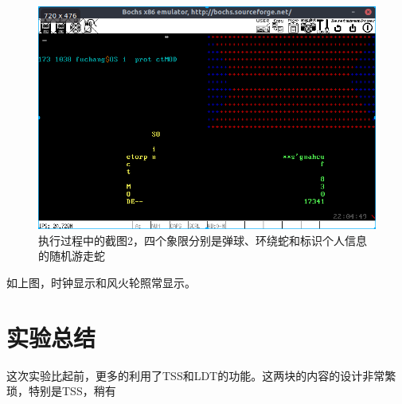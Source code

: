 \documentclass[a4paper,11pt,UTF8]{ctexart}
\newcommand{\bottomcaption}{%
\setlength{\abovecaptionskip}{6pt}%
\setlength{\belowcaptionskip}{6pt}%
\caption}
\begin{document}
	\begin{figure}[htbp]
		\centering
		\includegraphics[width=15cm]{img/3.png}
		\bottomcaption{执行过程中的截图2，四个象限分别是弹球、环绕蛇和标识个人信息的随机游走蛇}
	\end{figure}
	如上图，时钟显示和风火轮照常显示。
	

\section{实验总结}
	这次实验比起前，更多的利用了TSS和LDT的功能。这两块的内容的设计非常繁琐，特别是TSS，稍有



\clearpage
\end{document}
